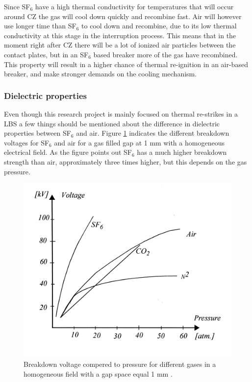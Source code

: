 \documentclass[10pt,a4paper]{article}
\begin{document}
Since SF${_6}$ have a high thermal conductivity for temperatures that will occur around CZ the gas will cool down quickly and recombine fast. Air will however use longer time than SF${_6}$ to cool down and recombine, due to its low thermal conductivity at this stage in the interruption process. This means that in the moment right after CZ there will be a lot of ionized air particles between the contact plates, but in an SF${_6}$ based breaker more of the gas have recombined. This property will result in a higher chance of thermal re-ignition in an air-based breaker, and make stronger demands on the cooling mechanism.

\subsubsection*{Dielectric properties} 

Even though this research project is mainly focused on thermal re-strikes in a LBS a few things should be mentioned about the difference in dielectric properties between SF${_6}$ and air. Figure \ref{fig:breakDownVoltage} indicates the different breakdown voltages for SF$_6$ and air for a gas filled gap at 1 mm with a homogeneous electrical field. As the figure points out SF$_6$ has a much higher breakdown strength than air, approximately three times higher, but this depends on the gas pressure.

\begin{figure}[H]
\centering
\includegraphics[scale=1]{Bilder/Discussion/Breakdown_voltage.png}
\caption{Breakdown voltage compered to pressure for different gases in a homogeneous field with a gap space equal 1 mm  \cite{bib:TET4160HVIM}.} \label{fig:breakDownVoltage}
\end{figure}
\end{document}
